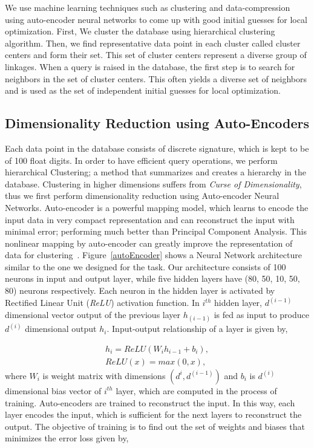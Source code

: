 \documentclass[twocolumn,10pt]{asme2ej}
\begin{document}
We use machine learning techniques such as clustering and data-compression using auto-encoder neural networks to come up with good initial guesses for local optimization.
First, We cluster the database using hierarchical clustering algorithm.
Then, we find representative data point in each cluster called cluster centers and form their set.
This set of cluster centers represent a diverse group of linkages.
When a query is raised in the database, the first step is to search for neighbors in the set of cluster centers.
This often yields a diverse set of neighbors and is used as the set of independent initial guesses for local optimization.

\subsection{Dimensionality Reduction using Auto-Encoders}
Each data point in the database consists of discrete signature, which is kept to be of 100 float digits.
In order to have efficient query operations, we perform hierarchical Clustering; a method that summarizes and creates a hierarchy in the database.
Clustering in higher dimensions suffers from \emph{Curse of Dimensionality}\cite{marimont1979}, thus we first perform dimensionality reduction using Auto-encoder Neural Networks.
Auto-encoder is a powerful mapping model, which learns to encode the input data in very compact representation and can reconstruct the input with minimal error; performing much better than Principal Component Analysis\cite{hinton2006}.
This nonlinear mapping by auto-encoder can greatly improve the representation of data for clustering~\cite{song2013}.
Figure~\ref{autoEncoder} shows a Neural Network architecture similar to the one we designed for the task.
Our architecture consists of 100 neurons in input and output layer, while five hidden layers have (80, 50, 10, 50, 80) neurons respectively.
Each neuron in the hidden layer is activated by Rectified Linear Unit (\emph{ReLU}) activation function.
In $i^{th}$ hidden layer, $d^{(i-1)}$ dimensional vector output of the previous layer $h_(i-1)$ is fed as input to produce $d^{(i)}$ dimensional output $h_i$.
Input-output relationship of a layer is given by,

\begin{eqnarray}\label{nnlayer}
  h_i = ReLU(W_{i}h_{i-1} + b_{i}), \\
  ReLU(x) = max(0, x),
\end{eqnarray}
where $W_i$ is weight matrix with dimensions $(d^{i}, d^{(i-1)})$ and $b_i$ is $d^{(i)}$ dimensional bias vector of $i^{th}$ layer, which are computed in the process of training.
Auto-encoders are trained to reconstruct the input.
In this way, each layer encodes the input, which is sufficient for the next layers to reconstruct the output.
The objective of training is to find out the set of weights and biases that minimizes the error loss given by,
\end{document}
